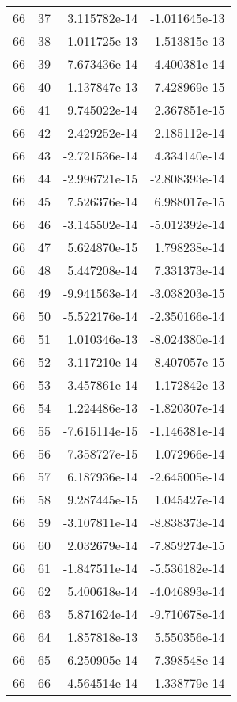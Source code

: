 \begin{tabular}{rrrr}
  66 &   37 &  3.115782e-14 & -1.011645e-13 \\
  66 &   38 &  1.011725e-13 &  1.513815e-13 \\
  66 &   39 &  7.673436e-14 & -4.400381e-14 \\
  66 &   40 &  1.137847e-13 & -7.428969e-15 \\
  66 &   41 &  9.745022e-14 &  2.367851e-15 \\
  66 &   42 &  2.429252e-14 &  2.185112e-14 \\
  66 &   43 & -2.721536e-14 &  4.334140e-14 \\
  66 &   44 & -2.996721e-15 & -2.808393e-14 \\
  66 &   45 &  7.526376e-14 &  6.988017e-15 \\
  66 &   46 & -3.145502e-14 & -5.012392e-14 \\
  66 &   47 &  5.624870e-15 &  1.798238e-14 \\
  66 &   48 &  5.447208e-14 &  7.331373e-14 \\
  66 &   49 & -9.941563e-14 & -3.038203e-15 \\
  66 &   50 & -5.522176e-14 & -2.350166e-14 \\
  66 &   51 &  1.010346e-13 & -8.024380e-14 \\
  66 &   52 &  3.117210e-14 & -8.407057e-15 \\
  66 &   53 & -3.457861e-14 & -1.172842e-13 \\
  66 &   54 &  1.224486e-13 & -1.820307e-14 \\
  66 &   55 & -7.615114e-15 & -1.146381e-14 \\
  66 &   56 &  7.358727e-15 &  1.072966e-14 \\
  66 &   57 &  6.187936e-14 & -2.645005e-14 \\
  66 &   58 &  9.287445e-15 &  1.045427e-14 \\
  66 &   59 & -3.107811e-14 & -8.838373e-14 \\
  66 &   60 &  2.032679e-14 & -7.859274e-15 \\
  66 &   61 & -1.847511e-14 & -5.536182e-14 \\
  66 &   62 &  5.400618e-14 & -4.046893e-14 \\
  66 &   63 &  5.871624e-14 & -9.710678e-14 \\
  66 &   64 &  1.857818e-13 &  5.550356e-14 \\
  66 &   65 &  6.250905e-14 &  7.398548e-14 \\
  66 &   66 &  4.564514e-14 & -1.338779e-14 \\

\end{tabular}
